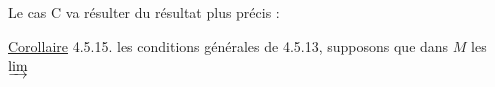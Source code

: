 Le cas C va résulter du résultat plus précis :

\uline{Corollaire} 4.5.15.  les conditions générales de 4.5.13, supposons que dans $M$ les $\varinjlim$
